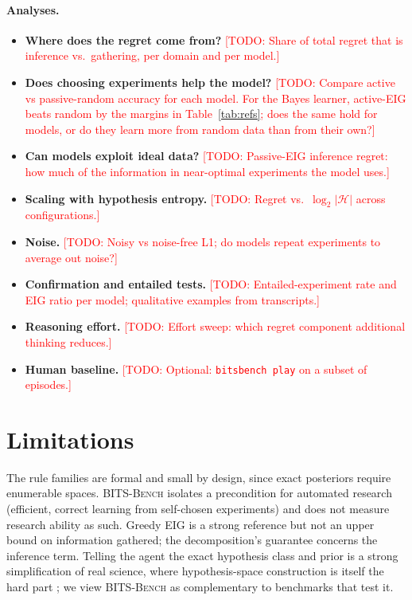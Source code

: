 \documentclass[11pt]{article}
\newcommand{\todo}[1]{\textcolor{red}{[TODO: #1]}}
\newcommand{\Hs}{\mathcal{H}}
\newcommand{\bench}{\textsc{BITS-Bench}}
\begin{document}
\paragraph{Analyses.}
\begin{itemize}[leftmargin=*,itemsep=2pt]
\item \textbf{Where does the regret come from?} \todo{Share of total regret that is inference vs.\
gathering, per domain and per model.}
\item \textbf{Does choosing experiments help the model?} \todo{Compare active vs passive-random accuracy
for each model. For the Bayes learner, active-EIG beats random by the margins in Table~\ref{tab:refs};
does the same hold for models, or do they learn more from random data than from their own?}
\item \textbf{Can models exploit ideal data?} \todo{Passive-EIG inference regret: how much of the
information in near-optimal experiments the model uses.}
\item \textbf{Scaling with hypothesis entropy.} \todo{Regret vs.\ $\log_2|\Hs|$ across configurations.}
\item \textbf{Noise.} \todo{Noisy vs noise-free L1; do models repeat experiments to average out noise?}
\item \textbf{Confirmation and entailed tests.} \todo{Entailed-experiment rate and EIG ratio per model;
qualitative examples from transcripts.}
\item \textbf{Reasoning effort.} \todo{Effort sweep: which regret component additional thinking
reduces.}
\item \textbf{Human baseline.} \todo{Optional: \texttt{bitsbench play} on a subset of episodes.}
\end{itemize}

\section{Limitations}

The rule families are formal and small by design, since exact posteriors require enumerable spaces.
\bench{} isolates a precondition for automated research (efficient, correct learning from self-chosen
experiments) and does not measure research ability as such. Greedy EIG is a strong reference but not an
upper bound on information gathered; the decomposition's guarantee concerns the inference term. Telling
the agent the exact hypothesis class and prior is a strong simplification of real science, where
hypothesis-space construction is itself the hard part \citep{hypoarena2026}; we view \bench{} as
complementary to benchmarks that test it.
\end{document}
